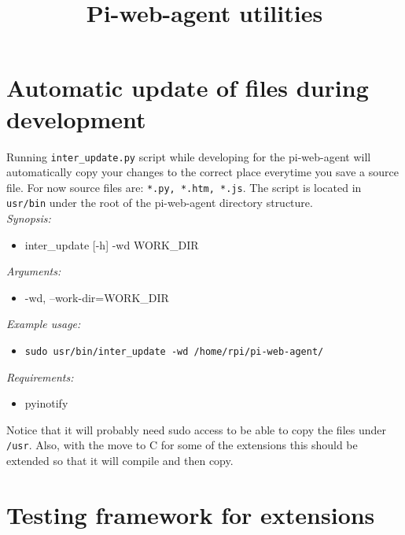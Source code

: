 \documentclass[a4paper, 12pt]{article}
\title{Pi-web-agent utilities}
\begin{document}
\maketitle
\section{Automatic update of files during development}

Running \texttt{inter\_update.py} script while developing for the pi-web-agent will automatically copy your changes to the correct place everytime you save a source file. For now source files are: \texttt{*.py, *.htm, *.js}. The script is located in \texttt{usr/bin} under the root of the pi-web-agent directory structure. \\


\textit{Synopsis:}
\begin{itemize}
\item[] inter\_update [-h] -wd WORK\_DIR
\end{itemize}

\textit{Arguments:}
\begin{itemize}
\item[] -wd, --work-dir=WORK\_DIR
\end{itemize}

\textit{Example usage:}
\begin{itemize}
\item[] \texttt{sudo usr/bin/inter\_update -wd /home/rpi/pi-web-agent/}
\end{itemize}


\textit{Requirements:}
\begin{itemize}
\item[] pyinotify
\end{itemize}

Notice that it will probably need sudo access to be able to copy the files under \texttt{/usr}. Also, with the move to C for some of the extensions this should be extended so that it will compile and then copy.
 
\section{Testing framework for extensions}
\end{document}
